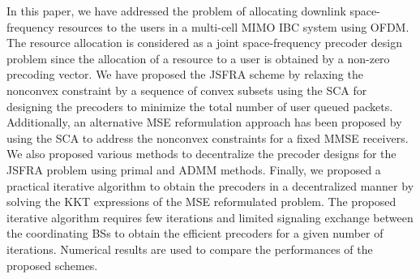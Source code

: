 In this paper, we have addressed the problem of allocating downlink space-frequency resources to the users in a multi-cell \ac{MIMO} \ac{IBC} system using \ac{OFDM}. The resource allocation is considered as a joint space-frequency precoder design problem since the allocation of a resource to a user is obtained by a non-zero precoding vector. We have proposed the \ac{JSFRA} scheme by relaxing the nonconvex constraint by a sequence of convex subsets using the \ac{SCA} for designing the precoders to minimize the total number of user queued packets. Additionally, an alternative \ac{MSE} reformulation approach has been proposed by using the \ac{SCA} to address the nonconvex constraints for a fixed \ac{MMSE} receivers. We also proposed various methods to decentralize the precoder designs for the \ac{JSFRA} problem using primal and \ac{ADMM} methods. Finally, we proposed a practical iterative algorithm to obtain the precoders in a decentralized manner by solving the \ac{KKT} expressions of the \ac{MSE} reformulated problem. The proposed iterative algorithm requires few iterations and limited signaling exchange between the coordinating \acp{BS} to obtain the efficient precoders for a given number of iterations. Numerical results are used to compare the performances of the proposed schemes.